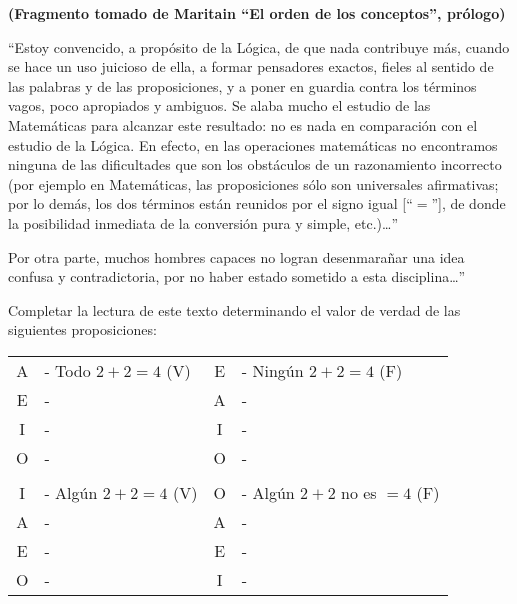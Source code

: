 \documentclass{article}
\begin{document}
\begin{center}
    \large{\textbf{(Fragmento tomado de Maritain ``El orden de los conceptos'', prólogo)}}
\end{center}
    
    ``Estoy convencido, a propósito de la Lógica, de que nada contribuye más, cuando se hace un uso juicioso de ella, a formar pensadores exactos, fieles al sentido de las palabras y de las proposiciones, y a poner en guardia contra los términos vagos, poco apropiados y ambiguos. Se alaba mucho el estudio de las Matemáticas para alcanzar este resultado: no es nada en comparación con el estudio de la Lógica. En efecto, en las operaciones matemáticas no encontramos ninguna de las dificultades que son los obstáculos de un razonamiento incorrecto (por ejemplo en Matemáticas, las proposiciones sólo son universales afirmativas; por lo demás, los dos términos están reunidos por el signo igual [``$=$''], de donde la posibilidad inmediata de la conversión pura y simple, etc.)\ldots'' \par
    Por otra parte, muchos hombres capaces no logran desenmarañar una idea confusa y contradictoria, por no haber estado sometido a esta disciplina\ldots'' \par
    
    \noindent Completar la lectura de este texto determinando el valor de verdad de las siguientes proposiciones: \par
    
\begin{center}
\begin{tabular}{c l c l}
    A & - Todo $2 + 2 = 4$ (V)  & \hspace{2cm} E & - Ningún $2 + 2 = 4$ (F)        \\
    E & -                       & \hspace{2cm} A & -                               \\
    I & -                       & \hspace{2cm} I & -                               \\
    O & -                       & \hspace{2cm} O & -                               \\
                                &                                              \\
    I & - Algún $2 + 2 = 4$ (V) & \hspace{2cm} O & - Algún $2 + 2$ no es $= 4$ (F) \\
    A & -                       & \hspace{2cm} A & -                               \\
    E & -                       & \hspace{2cm} E & -                               \\
    O & -                       & \hspace{2cm} I & -                               \\
\end{tabular}
\end{center}
\end{document}
